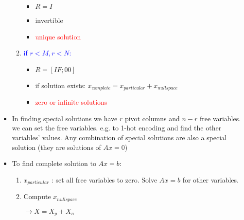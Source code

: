 \documentclass[a4paper,12pt]{article}
\newcommand{\blue}[1]{\textcolor{blue}{#1}}
\newcommand{\red}[1]{\textcolor{red}{#1}}
\begin{document}
\begin{itemize}
\begin{enumerate}
\begin{itemize}
\item $R = I$
\item invertible
\item \red{unique solution}
\end{itemize}
\item \blue{if $r < M, r < N$:}
\begin{itemize}
\item $R = [ I F; 0 0]$
\item if solution exists: $x_{complete} = x_{particular} + x_{nullspace}$
\item \red{zero or infinite solutions}
\end{itemize}
\end{enumerate}

\item In finding special solutions we have $r$ pivot columns and $n - r$ free variables.
we can set the free variables. e.g. to 1-hot encoding and find the other variables' values. Any combination of
special solutions are also a special solution (they are solutions of $Ax=0$)

\item To find complete solution to $Ax=b$:
\begin{enumerate}
\item $x_{particular}$ : set all free variables to zero. Solve $Ax=b$ for other variables.

\item Compute $x_{nullspace}$

\hspace{1 cm} $\longrightarrow X = X_p + X_n$

\end{enumerate} 
\end{itemize}
\end{document}
